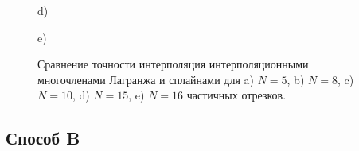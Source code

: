 \documentclass[
11pt,
master, %
subf, %
href, %
colorlinks=true, %
times, %
]{disser}
\begin{document}
\begin{figure}[h]
\begin{minipage}[h]{0.48\linewidth}
\end{minipage}
\hfill
\begin{minipage}[h]{0.48\linewidth}
 d)
\end{minipage}
\vfill
\begin{minipage}[h]{\linewidth}
 e)
\end{minipage}
\caption{Сравнение точности интерполяция интерполяционными многочленами Лагранжа и сплайнами для a) $N=5$, b) $N=8$, c) $N=10$, d) $N=15$, e) $N=16$ частичных отрезков.}
\label{ris:3}
\end{figure}

\newpage
\subsection{Способ B}
\end{document}
